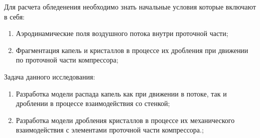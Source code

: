 Для расчета обледенения необходимо знать начальные условия которые включают в себя:
\begin{enumerate}[label=\arabic*)\hspace{1em}, leftmargin=2cm, itemsep=0em]
	\item Аэродинамические поля воздушного потока внутри проточной части;
	\item Фрагментация капель и кристаллов в процессе их дробления при движении по проточной части компрессора;
\end{enumerate}
Задача данного исследования:
\begin{enumerate}[label=\arabic*)\hspace{1em}, leftmargin=2cm, itemsep=0em]
	\item Разработка модели распада капель как при движении в потоке, так и дроблении в процессе взаимодействия со стенкой;
	\item Разработка модели дробления кристаллов в процессе их механического взаимодействия с элементами проточной части компрессора.;
\end{enumerate} 